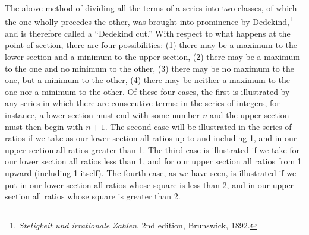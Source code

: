 {The above method of dividing all the terms of a series
into
two
classes, of which the one wholly precedes the other, was brought into
prominence by Dedekind,\footnote{\textit{Stetigkeit und irrationale Zahlen},
2nd edition, Brunswick,
1892.} and is
therefore called a ``Dedekind cut.''
With respect to what happens at the point of section, there are four
possibilities: (1) there may be a maximum to the lower section and a
minimum to the upper section, (2) there may be a maximum to the one and
no minimum to the other, (3) there may be no maximum to the one, but a
minimum to the other, (4) there may be neither a maximum to the one nor
a minimum to the other. Of these four cases, the first is illustrated
by any series in which there are consecutive terms: in the series of
integers, for instance, a lower section must end with some number \textit{n} and
the upper section must then begin with $n+1$. The second
case will be
illustrated in the series of ratios if we take as our lower section all
ratios up to and including 1, and in our upper section all ratios
greater than 1. The third case is illustrated if we take for our lower
section all ratios less than 1, and for our upper section all ratios
from 1 upward (including 1 itself). The fourth case, as we have seen,
is illustrated if we put in our lower section all ratios whose square
is less than 2, and in our upper section all ratios whose square is
greater than 2.}
